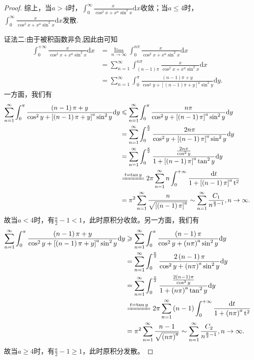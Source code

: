 \documentclass[../../main.tex]{subfiles}
\begin{document}
\begin{proof}
综上，当$a>4$时，$\int_0^{\infty}\frac{x}{\cos^2x+x^a\sin^2x}\mathrm{d}x$收敛；当$a\leqslant 4$时，$\int_0^{\infty}\frac{x}{\cos^2x+x^a\sin^2x}\mathrm{d}x$发散.

{\color{blue}证法二:}由于被积函数非负,因此由可知
\begin{align*}
\int_0^{+\infty}{\frac{x}{\cos ^2x+x^a\sin ^2x}\mathrm{d}x}&=\underset{n\rightarrow \infty}{\lim}\int_0^{n\pi}{\frac{x}{\cos ^2x+x^a\sin ^2x}\mathrm{d}x}
\\
&=\sum_{n=1}^{\infty}{\int_{\left( n-1 \right) \pi}^{n\pi}{\frac{x}{\cos ^2x+x^a\sin ^2x}\mathrm{d}x}}
\\
&=\sum_{n=1}^{\infty}{\int_0^{\pi}{\frac{\left( n-1 \right) \pi +y}{\cos ^2y+\left[ \left( n-1 \right) \pi +y \right] ^a\sin ^2y}\mathrm{d}y}}.
\end{align*}
一方面，我们有
\begin{align*}
\sum_{n=1}^{\infty}{\int_0^{\pi}{\frac{\left( n-1 \right) \pi +y}{\cos ^2y+\left[ \left( n-1 \right) \pi +y \right] ^a\sin ^2y}\mathrm{d}y}}&\leqslant \sum_{n=1}^{\infty}{\int_0^{\pi}{\frac{n\pi}{\cos ^2y+\left[ \left( n-1 \right) \pi \right] ^a\sin ^2y}\mathrm{d}y}}\\
&=\sum_{n=1}^{\infty}{\int_0^{\frac{\pi}{2}}{\frac{2n\pi}{\cos ^2y+\left[ \left( n-1 \right) \pi \right] ^a\sin ^2y}\mathrm{d}y}}\\
&=\sum_{n=1}^{\infty}{\int_0^{\frac{\pi}{2}}{\frac{\frac{2n\pi}{\cos ^2y}}{1+\left[ \left( n-1 \right) \pi \right] ^a\tan ^2y}\mathrm{d}y}}
\\
&\xlongequal{t=\tan y}2\pi \sum_{n=1}^{\infty}{n\int_0^{+\infty}{\frac{\mathrm{d}t}{1+\left[ \left( n-1 \right) \pi \right] ^a\mathrm{t}^2}}}\\
&=\pi ^2\sum_{n=1}^{\infty}{\frac{n}{\sqrt{\left[ \left( n-1 \right) \pi \right] ^a}}}\sim \sum_{n=1}^{\infty}{\frac{C_1}{n^{\frac{a}{2}-1}}},n\rightarrow \infty .
\end{align*}
故当$a<4$时，有$\frac{a}{2}-1<1$，此时原积分收敛。另一方面，我们有
\begin{align*}
\sum_{n=1}^{\infty}{\int_0^{\pi}{\frac{\left( n-1 \right) \pi +y}{\cos ^2y+\left[ \left( n-1 \right) \pi +y \right] ^a\sin ^2y}\mathrm{d}y}}&\geqslant \sum_{n=1}^{\infty}{\int_0^{\pi}{\frac{\left( n-1 \right) \pi}{\cos ^2y+\left( n\pi \right) ^a\sin ^2y}\mathrm{d}y}}\\
&=\sum_{n=1}^{\infty}{\int_0^{\frac{\pi}{2}}{\frac{2\left( n-1 \right) \pi}{\cos ^2y+\left( n\pi \right) ^a\sin ^2y}\mathrm{d}y}}\\
&=\sum_{n=1}^{\infty}{\int_0^{\frac{\pi}{2}}{\frac{\frac{2\left( n-1 \right) \pi}{\cos ^2y}}{1+\left( n\pi \right) ^a\tan ^2y}\mathrm{d}y}}\\
&\xlongequal{t=\tan y}2\pi \sum_{n=1}^{\infty}{\left( n-1 \right) \int_0^{+\infty}{\frac{\mathrm{d}t}{1+\left( n\pi \right) ^a\mathrm{t}^2}}}\\
&=\pi ^2\sum_{n=1}^{\infty}{\frac{n-1}{\sqrt{\left( n\pi \right) ^a}}}\sim \sum_{n=1}^{\infty}{\frac{C_2}{n^{\frac{a}{2}-1}}},n\rightarrow \infty .
\end{align*}
故当$a\geqslant 4$时，有$\frac{a}{2}-1\geqslant 1$，此时原积分发散。
\end{proof}
\end{document}
